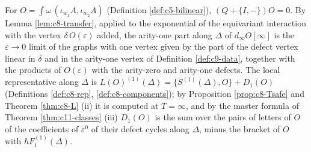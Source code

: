 For $O=\int\omega\,(\iota_{w_1}A,\iota_{w_2}A)$ (Definition \ref{def:c5-bilinear}), $(Q+\{I,-\})O=0$. By Lemma \ref{lem:c8-transfer}, applied to the exponential of the equivariant interaction with the vertex $\delta\,O(\varepsilon)$ added, the arity-one part along $\Delta$ of $d_\infty O[\infty]$ is the $\varepsilon\to0$ limit of the graphs with one vertex given by the part of the defect vertex linear in $\delta$ and in the arity-one vertex of Definition \ref{def:c9-data}, together with the products of $O(\varepsilon)$ with the arity-zero and arity-one defects. The local representative along $\Delta$ is $L(O)^{(1)}(\Delta)=\{S^{(1)}(\Delta),O\}+D_1(O)$ (Definitions \ref{def:c8-rep}, \ref{def:c8-components}); by Proposition \ref{prop:c8-Tsafe} and Theorem \ref{thm:c8-L} (ii) it is computed at $T=\infty$, and by the master formula of Theorem \ref{thm:c11-classes} (iii) $D_1(O)$ is the sum over the pairs of letters of $O$ of the coefficients of $\varepsilon^0$ of their defect cycles along $\Delta$, minus the bracket of $O$ with $\hbar F_1^{(1)}(\Delta)$.
